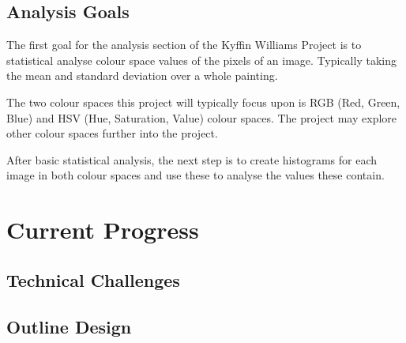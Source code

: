 \documentclass[11pt,fleqn,twoside]{article}
\begin{document}
\subsection{Analysis Goals}
The first goal for the analysis section of the Kyffin Williams Project is to statistical analyse
colour space values of the pixels of an image. Typically taking the mean and standard deviation
over a whole painting.

The two colour spaces this project will typically focus upon is RGB (Red, Green, Blue) and HSV
(Hue, Saturation, Value) colour spaces. The project may explore other colour spaces further into 
the project.

After basic statistical analysis, the next step is to create histograms for each image in both 
colour spaces and use these to analyse the values these contain.




\section{Current Progress}

\subsection{Technical Challenges}


\subsection{Outline Design}
\end{document}

